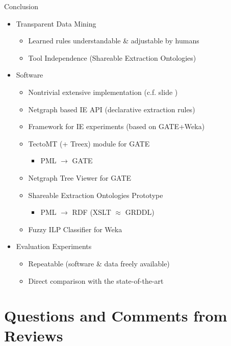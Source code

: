 \documentclass[xcolor=dvipsnames]{beamer}
\begin{document}
\begin{frame}{Conclusion} 
	\begin{itemize}
		\item Transparent Data Mining
		\begin{itemize}
			\item Learned rules understandable \& adjustable by humans
			\item Tool Independence (Shareable Extraction Ontologies)
		\end{itemize}
		
		\item Software
		\begin{itemize}
		\item \alert{Nontrivial extensive implementation} (c.f. slide \pageref{implementation})
		\item Netgraph based IE API (declarative extraction rules)
		\item Framework for IE experiments (based on GATE+Weka)
		\item TectoMT (+ Treex) module for GATE
		\begin{itemize}
			\item PML $\rightarrow$ GATE
		\end{itemize}
		\item Netgraph Tree Viewer for GATE
		\item Shareable Extraction Ontologies Prototype
		\begin{itemize}
			\item PML $\rightarrow$ RDF (XSLT $\approx$ GRDDL)
		\end{itemize}
		\item Fuzzy ILP Classifier for Weka
		\end{itemize}

		\item Evaluation Experiments
		\begin{itemize}
			\item \alert{Repeatable} (software \& data freely available)
			\item Direct comparison with the state-of-the-art
		\end{itemize}
	\end{itemize}
\end{frame}


\section[Questions \& Comments]{Questions and Comments from Reviews} 
\frame{\tableofcontents[currentsection]}
\end{document}
